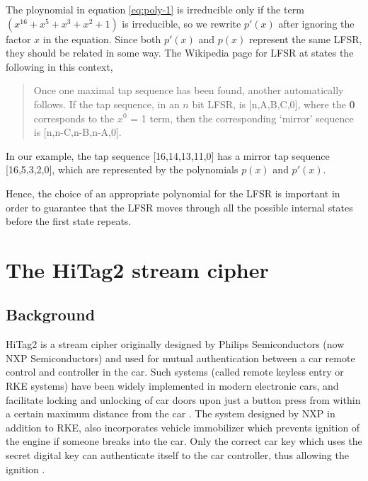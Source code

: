 The ploynomial in equation \ref{eq:poly-1} is irreducible only if the term $(x^{16} + x^{5} + x^{3} + x^{2} + 1)$ is irreducible, so we rewrite $p'(x)$ after ignoring the factor $x$ in the equation. Since both $p'(x)$ and $p(x)$ represent the same LFSR, they should be related in some way. The Wikipedia page for LFSR at \cite{lfsr-wiki} states the following in this context,

\begin{quote}
\footnotesize{
Once one maximal tap sequence has been found, another automatically follows. If the tap sequence, in an $n$ bit LFSR, is [n,A,B,C,0], where the \textbf{0} corresponds to the $x^0$ = 1 term, then the corresponding `mirror' sequence is [n,n-C,n-B,n-A,0].}
\end{quote}

In our example, the tap sequence [16,14,13,11,0] has a mirror tap sequence [16,5,3,2,0], which are represented by the polynomials $p(x)$ and $p'(x)$.

Hence, the choice of an appropriate polynomial for the LFSR is important in order to guarantee that the LFSR moves through all the possible internal states before the first state repeats.

%
%

\section{The HiTag2 stream cipher}
\label{sec:hitag2}

\subsection{Background}
\label{sec:hitag2-background}
HiTag2 is a stream cipher originally designed by Philips Semiconductors (now NXP Semiconductors) and used for mutual authentication between a car remote control and controller in the car. Such systems (called remote keyless entry or RKE systems) have been widely implemented in modern electronic cars, and facilitate locking and unlocking of car doors upon just a button press from within a certain maximum distance from the car \cite{rke-wiki}. The system designed by NXP in addition to RKE, also incorporates vehicle immobilizer which prevents ignition of the engine if someone breaks into the car. Only the correct car key which uses the secret digital key can authenticate itself to the car controller, thus allowing the ignition \cite{rke-nxp}.

